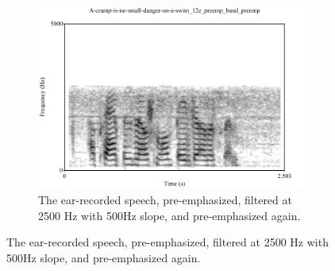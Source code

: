 \DIFdelbegin %
\DIFdelend \DIFaddbegin \begin{figure}[h!]
\DIFaddendFL \centering
\DIFdelbeginFL %
\DIFdelendFL \DIFaddbeginFL \begin{subfigure}{\textwidth}
  \DIFaddendFL \centering
  \includegraphics[width=1\linewidth]{figure/spctgrmNarrowEarNoisePrempFiltPremp.pdf}
  \caption{The ear-recorded speech, pre-emphasized, filtered at 2500 Hz with 500Hz slope, and pre-emphasized again.}
  \label{spctgrmNarrowEarNoisePrempFiltPremp_35}
\end{subfigure}%
\DIFdelbeginFL %
\DIFdelendFL %
\DIFaddbeginFL 


\end{figure}
